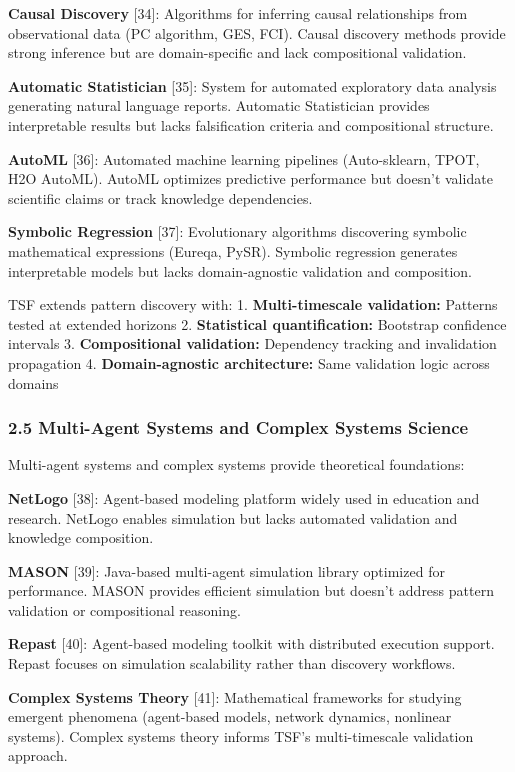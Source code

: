 \documentclass[
]{article}
\begin{document}
\textbf{Causal Discovery} {[}34{]}: Algorithms for inferring causal
relationships from observational data (PC algorithm, GES, FCI). Causal
discovery methods provide strong inference but are domain-specific and
lack compositional validation.

\textbf{Automatic Statistician} {[}35{]}: System for automated
exploratory data analysis generating natural language reports. Automatic
Statistician provides interpretable results but lacks falsification
criteria and compositional structure.

\textbf{AutoML} {[}36{]}: Automated machine learning pipelines
(Auto-sklearn, TPOT, H2O AutoML). AutoML optimizes predictive
performance but doesn't validate scientific claims or track knowledge
dependencies.

\textbf{Symbolic Regression} {[}37{]}: Evolutionary algorithms
discovering symbolic mathematical expressions (Eureqa, PySR). Symbolic
regression generates interpretable models but lacks domain-agnostic
validation and composition.

TSF extends pattern discovery with: 1. \textbf{Multi-timescale
validation:} Patterns tested at extended horizons 2. \textbf{Statistical
quantification:} Bootstrap confidence intervals 3. \textbf{Compositional
validation:} Dependency tracking and invalidation propagation 4.
\textbf{Domain-agnostic architecture:} Same validation logic across
domains

\subsubsection{2.5 Multi-Agent Systems and Complex Systems
Science}\label{multi-agent-systems-and-complex-systems-science}

Multi-agent systems and complex systems provide theoretical foundations:

\textbf{NetLogo} {[}38{]}: Agent-based modeling platform widely used in
education and research. NetLogo enables simulation but lacks automated
validation and knowledge composition.

\textbf{MASON} {[}39{]}: Java-based multi-agent simulation library
optimized for performance. MASON provides efficient simulation but
doesn't address pattern validation or compositional reasoning.

\textbf{Repast} {[}40{]}: Agent-based modeling toolkit with distributed
execution support. Repast focuses on simulation scalability rather than
discovery workflows.

\textbf{Complex Systems Theory} {[}41{]}: Mathematical frameworks for
studying emergent phenomena (agent-based models, network dynamics,
nonlinear systems). Complex systems theory informs TSF's multi-timescale
validation approach.
\end{document}
